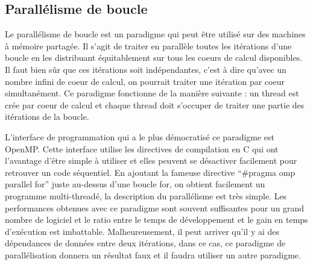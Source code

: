 \subsection{Parallélisme de boucle}
Le parallélisme de boucle est un paradigme qui peut être utilisé sur des machines à mémoire partagée.
%
Il s'agit de traiter en parallèle toutes les itérations d'une boucle en les distribuant équitablement sur tous les coeurs de calcul disponibles.
%
Il faut bien sûr que ces itérations soit indépendantes, c'est à dire qu'avec un nombre infini de coeur de calcul, on pourrait traiter une itération par coeur simultanément.
%
Ce paradigme fonctionne de la manière suivante : un thread est crée par coeur de calcul et chaque thread doit s'occuper de traiter une partie des itérations de la boucle.
%


L'interface de programmation qui a le plus démocratisé ce paradigme est OpenMP.
%
Cette interface utilise les directives de compilation en C qui ont l'avantage d'être simple à utiliser et elles peuvent se désactiver facilement pour retrouver un code séquentiel.
%
En ajoutant la fameuse directive ``\#pragma omp parallel for'' juste au-dessus d'une boucle for, on obtient facilement un programme multi-threadé, la description du parallélisme est très simple.
%
Les performances obtenues avec ce paradigme sont souvent suffisantes pour un grand nombre de logiciel et le ratio entre le temps de développement et le gain en temps d'exécution est imbattable.
%
Malheureusement, il peut arriver qu'il y ai des dépendances de données entre deux itérations, dans ce cas, ce paradigme de parallélisation donnera un résultat faux et il faudra utiliser un autre paradigme.
